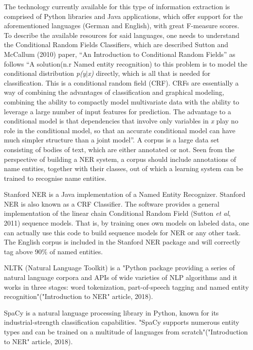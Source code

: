 \documentclass[12pt,a4paper]{article}
\begin{document}
\qquad	The technology currently available for this type of information extraction is comprised of Python libraries and Java applications, which offer support for the aforementioned languages (German and English), with great F-measure scores. To describe the available resources for said languages, one needs to understand the Conditional Random Fields Classifiers, which are described Sutton and McCallum (2010) paper, “An Introduction to Conditional Random Fields” as follows “A solution(n.r Named entity recognition) to this problem is to model the conditional distribution \textit{p(y$|$x)} directly, which is all that is needed for classification. This is a conditional random field (CRF). CRFs are essentially a way of combining the advantages of classification and graphical modeling, combining the ability to compactly model multivariate data with the ability to leverage a large number of input features for prediction. The advantage to a conditional model is that dependencies that involve only variables in \textit{x} play no role in the conditional model, so that an accurate conditional model can have much simpler structure than a joint model”. A corpus is a large data set consisting of bodies of text, which are either annotated or not. Seen from the perspective of building a NER system, a corpus should include annotations of name entities, together with their classes, out of which a learning system can be trained to recognise name entities.

\qquad	Stanford NER is a Java implementation of a Named Entity Recognizer. Stanford NER is also known as a CRF Classifier. The software provides a general implementation of  the linear chain Conditional Random Field (Sutton \textit{et al}, 2011) sequence models. That is, by training ones own models on labeled data, one can actually use this code to build sequence models for NER or any other task. The English corpus is included in the Stanford NER package and will correctly tag above 90$\%$ of named entities.

\qquad	NLTK (Natural Language Toolkit) is a "Python package providing a series of natural language corpora and APIs of wide varieties of NLP algorithms and it works in three stages: word tokenization, part-of-speech tagging and named entity recognition"("Introduction to NER" article, 2018).

\qquad	SpaCy is a natural language processing library in Python, known for its industrial-strength classification capabilities. "SpaCy supports numerous entity types and can be trained on a multitude of languages from scratch"("Introduction to NER" article, 2018).
\end{document}
